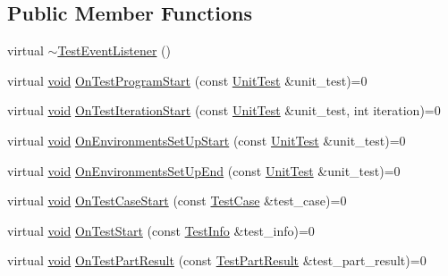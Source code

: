 \subsection*{Public Member Functions}
\begin{DoxyCompactItemize}
\item 
virtual \hyperlink{classtesting_1_1TestEventListener_a4512d19e7a108ec4926239ec1ea85d63}{$\sim$\-Test\-Event\-Listener} ()
\item 
virtual \hyperlink{legacy_8hpp_a8bb47f092d473522721002c86c13b94e}{void} \hyperlink{classtesting_1_1TestEventListener_a5f6c84f39851e8a603a2d2e10063816b}{On\-Test\-Program\-Start} (const \hyperlink{classtesting_1_1UnitTest}{Unit\-Test} \&unit\-\_\-test)=0
\item 
virtual \hyperlink{legacy_8hpp_a8bb47f092d473522721002c86c13b94e}{void} \hyperlink{classtesting_1_1TestEventListener_a60cc09b7907cb329d152eb5e7133bdeb}{On\-Test\-Iteration\-Start} (const \hyperlink{classtesting_1_1UnitTest}{Unit\-Test} \&unit\-\_\-test, int iteration)=0
\item 
virtual \hyperlink{legacy_8hpp_a8bb47f092d473522721002c86c13b94e}{void} \hyperlink{classtesting_1_1TestEventListener_aa6502e534919605be45f26a6daf9a40c}{On\-Environments\-Set\-Up\-Start} (const \hyperlink{classtesting_1_1UnitTest}{Unit\-Test} \&unit\-\_\-test)=0
\item 
virtual \hyperlink{legacy_8hpp_a8bb47f092d473522721002c86c13b94e}{void} \hyperlink{classtesting_1_1TestEventListener_aaa1021d75f5dbf3f05c829c1cc520341}{On\-Environments\-Set\-Up\-End} (const \hyperlink{classtesting_1_1UnitTest}{Unit\-Test} \&unit\-\_\-test)=0
\item 
virtual \hyperlink{legacy_8hpp_a8bb47f092d473522721002c86c13b94e}{void} \hyperlink{classtesting_1_1TestEventListener_ab4ed885d63f5bbff8076c1329b3dfe36}{On\-Test\-Case\-Start} (const \hyperlink{classtesting_1_1TestCase}{Test\-Case} \&test\-\_\-case)=0
\item 
virtual \hyperlink{legacy_8hpp_a8bb47f092d473522721002c86c13b94e}{void} \hyperlink{classtesting_1_1TestEventListener_ab4f6a0ca16ae75daf385b3b5914e1048}{On\-Test\-Start} (const \hyperlink{classtesting_1_1TestInfo}{Test\-Info} \&test\-\_\-info)=0
\item 
virtual \hyperlink{legacy_8hpp_a8bb47f092d473522721002c86c13b94e}{void} \hyperlink{classtesting_1_1TestEventListener_a054f8705c883fa120b91473aff38f2ee}{On\-Test\-Part\-Result} (const \hyperlink{classtesting_1_1TestPartResult}{Test\-Part\-Result} \&test\-\_\-part\-\_\-result)=0
\item 

\end{DoxyCompactItemize}
